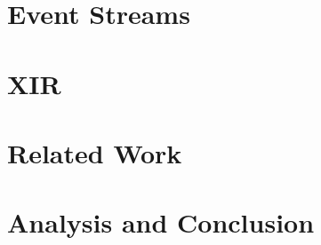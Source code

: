 \documentclass[conference]{IEEEtran}
\begin{document}
\section{Event Streams}\label{streams}


\section{XIR}\label{sec:xir}


\section{Related Work}


\section{Analysis and Conclusion}




\end{document}

